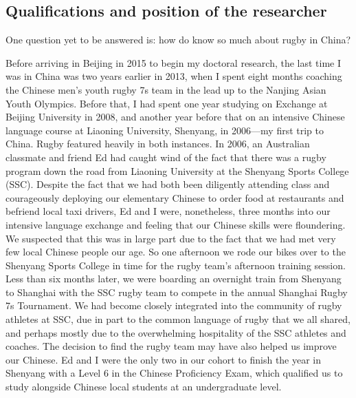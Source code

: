 \begin{CJK}{UTF8}{gbsn}
\section{Qualifications and position of the researcher}

One question yet to be answered is: how do know so much about rugby in China?

Before arriving in Beijing in 2015 to begin my doctoral research, the last time I was in China was two years earlier in 2013, when I spent eight months coaching the Chinese men's youth rugby 7s team in the lead up to the Nanjing Asian Youth Olympics.  Before that, I had spent one year studying on Exchange at Beijing University in 2008, and another year before that on an intensive Chinese language course at Liaoning University, Shenyang, in 2006---my first trip to China.  Rugby featured heavily in both instances.  In 2006, an Australian classmate and friend Ed had caught wind of the fact that there was a rugby program down the road from Liaoning University at the Shenyang Sports College (SSC).  Despite the fact that we had both been diligently attending class and courageously deploying our elementary Chinese to order food at restaurants and befriend local taxi drivers, Ed and I were, nonetheless, three months into our intensive language exchange and feeling that our Chinese skills were floundering.  We suspected that this was in large part due to the fact that we had met very few local Chinese people our age.  So one afternoon we rode our bikes over to the Shenyang Sports College in time for the rugby team's afternoon training session.  Less than six months later, we were boarding an overnight train from Shenyang to Shanghai with the SSC rugby team to compete in the annual Shanghai Rugby 7s Tournament.  We had become closely integrated into the community of rugby athletes at SSC, due in part to the common language of rugby that we all shared, and perhaps mostly due to the overwhelming hospitality of the SSC athletes and coaches.  The decision to find the rugby team may have also helped us improve our Chinese. Ed and I were the only two in our cohort to finish the year in Shenyang with a Level 6 in the Chinese Proficiency Exam, which qualified us to study alongside Chinese local students at an undergraduate level.


\end{CJK}
